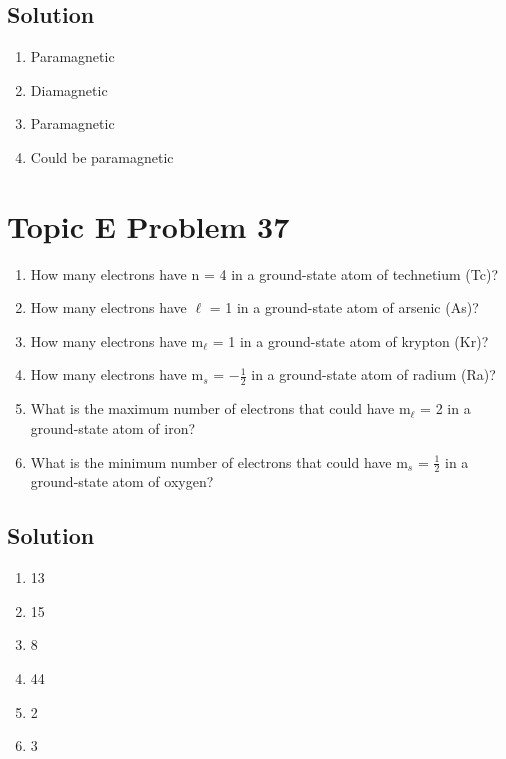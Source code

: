 \documentclass[10pt]{article}
\begin{document}
        \subsection{Solution}
            \begin{multicols}{2}
                \begin{enumerate}[label=\alph*)]
                    \item   Paramagnetic
                    \item   Diamagnetic
                    \item   Paramagnetic
                    \item   Could be paramagnetic
                \end{enumerate}
            \end{multicols}


    \section{Topic E Problem 37}
        \begin{enumerate}[label=\alph*)]
            \item   How many electrons have n = 4 in a ground-state atom of technetium (Tc)?
            \item   How many electrons have $\ell$ = 1 in a ground-state atom of arsenic (As)?
            \item   How many electrons have m$_\ell$ = 1 in a ground-state atom of krypton (Kr)?
            \item   How many electrons have m$_s$ = $-\frac{1}{2}$ in a ground-state atom of radium (Ra)?
            \item   What is the maximum number of electrons that could have m$_\ell$ = 2 in a ground-state atom of iron?
            \item   What is the minimum number of electrons that could have m$_s$ = $\frac{1}{2}$ in a ground-state atom of oxygen?
        \end{enumerate}

        \subsection{Solution}
            \begin{multicols}{3}
                \begin{enumerate}[label=\alph*)]
                    \item   13
                    \item   15
                    \item   8
                    \item   44
                    \item   2
                    \item   3
                \end{enumerate}
            \end{multicols}
\end{document}
